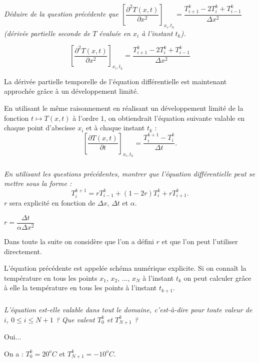 \documentclass[10pt,fleqn]{article} %
\begin{document}
\begin{multicols}{2}
\subparagraph{}\textit{Déduire de la question précédente que  
$\left[\dfrac{\partial^2 T(x,t)}{\partial x^2}\right]_{x_i,t_k} =
\dfrac{T_{i+1}^k-2T_{i}^k + T_{i-1}^k}{\Delta x^2 } $ (dérivée partielle seconde de 
$T$ évaluée en $x_i$ à l'instant $t_k$).}
\ifprof
\begin{corrige}
$$
\left[\dfrac{\partial^2 T(x,t)}{\partial x^2}\right]_{x_i,t_k} 
=
\dfrac{T_{i+1}^k-2T_{i}^k + T_{i-1}^k}{\Delta x^2 }
$$
\end{corrige}
\else
\fi
\ifprof
\else
\vspace{0.5cm}
La dérivée partielle temporelle de l'équation différentielle est maintenant approchée grâce à un
développement limité.

En utilisant le même raisonnement en réalisant un développement limité de la fonction 
$t\mapsto T(x,t)$ à l'ordre $1$, on obtiendrait l'équation suivante valable en chaque point
 d'abscisse $x_i$ et à chaque instant $t_k$ : 
$$
\left[\dfrac{\partial T(x,t)}{\partial t}\right]_{x_i,t_k} 
=
\dfrac{T_{i}^{k+1}- T_{i}^k}{\Delta t }.
$$
\fi



\subparagraph{}\textit{En utilisant les questions précédentes, montrer que 
l'équation différentielle peut se mettre sous la forme : 
$$
T_{i}^{k+1} = r T_{i-1}^{k} + \left( 1-2r \right) T_i^k + r T_{i+1}^k.
$$ 
}
$r$ sera explicité en fonction de $\Delta x$, $\Delta t$ et $\alpha$.
\ifprof
\begin{corrige}
$r=\dfrac{\Delta t}{\alpha \Delta x^2}$
\end{corrige}
\else
\fi

\ifprof
\else
\vspace{.5cm}

Dans toute la suite on considère que l'on a défini $r$ et que l'on peut l'utiliser directement. 
\vspace{.5cm}

L'équation précédente est appelée schéma numérique explicite. Si on connaît la température en tous les points $x_1$, $x_2$, ..., $x_N$ à  l'instant $t_k$ on peut calculer grâce à elle la température en tous les points à l'instant $t_{k+1}$.
\fi

\subparagraph{}\textit{L'équation est-elle valable dans tout le domaine, c'est-à-dire pour toute valeur de $i$, $0\leq i\leq N+1$ ? Que valent $T_0^k$ et $T_{N+1}^k$ ?}
\ifprof

\begin{corrige}
Oui...

On a : $T_0^k = 20^o C$ et $T^k_{N+1}=-10^o C$.  
\end{corrige}
\else
\fi



\end{multicols}
\end{document}
